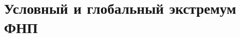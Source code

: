 \documentclass[../main.tex]{subfiles}
\begin{document}
 \chapter{Условный и глобальный экстремум ФНП}
 
 
\end{document}

